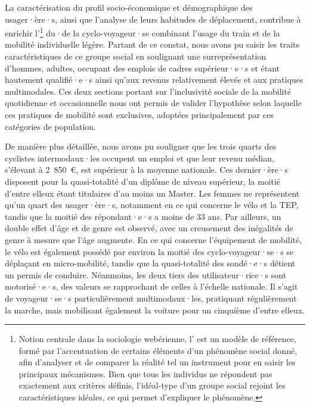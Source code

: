 \begin{refsegment}
La caractérisation du profil socio-économique et démographique des usager·ère·s, ainsi que l'analyse de leurs habitudes de déplacement, contribue à enrichir l'\footnote{
    Notion centrale dans la sociologie webérienne, l' est un modèle de référence, formé par l'accentuation de certains éléments d'un phénomène social donné, afin d'analyser et de comparer la réalité tel un instrument pour en saisir les principaux mécanismes. Bien que tous les individus ne répondent pas exactement aux critères définis, l'idéal-type d'un groupe social rejoint les caractéristiques idéales, ce qui permet d'expliquer le phénomène.
} du·de la cyclo-voyageur·se combinant l'usage du train et de la mobilité individuelle légère. Partant de ce constat, nous avons pu saisir les traits caractéristiques de ce groupe social en soulignant une surreprésentation d'hommes, adultes, occupant des emplois de cadres supérieur·e·s et étant hautement qualifié·e·s ainsi qu'aux revenus relativement élevés et aux pratiques multimodales. Ces deux sections portant sur l'inclusivité sociale de la mobilité quotidienne et occasionnelle nous ont permis de valider l'hypothèse selon laquelle ces pratiques de mobilité sont exclusives, adoptées principalement par ces catégories de population.%

De manière plus détaillée, nous avons pu souligner que les trois quarts des cyclistes intermodaux·les occupent un emploi et que leur revenu médian, s'élevant à 2~850~\euro, est supérieur à la moyenne nationale. Ces dernier·ère·s disposent pour la quasi-totalité d'un diplôme de niveau supérieur, la moitié d'entre elleux étant titulaires d'au moins un Master. Les femmes ne représentent qu'un quart des usager·ère·s, notamment en ce qui concerne le vélo et la \acrshort{TEP}, tandis que la moitié des répondant·e·s a moins de 33 ans. Par ailleurs, un double effet d'âge et de genre est observé, avec un creusement des inégalités de genre à mesure que l'âge augmente. En ce qui concerne l'équipement de mobilité, le vélo est également possédé par environ la moitié des cyclo-voyageur·se·s se déplaçant en micro-mobilité, tandis que la quasi-totalité des sondé·e·s détient un permis de conduire. Néanmoins, les deux tiers des utilisateur·rice·s sont motorisé·e·s, des valeurs se rapprochant de celles à l'échelle nationale. Il s'agit de voyageur·se·s particulièrement multimodaux·les, pratiquant régulièrement la marche, mais mobilisant également la voiture pour un cinquième d'entre elleux.%


\end{refsegment}
